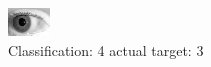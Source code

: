 \begin{figure}[h!]
\begin{center}
\includegraphics[width=0.60\columnwidth]{figures/ID325_class_4_target_3.png}
\end{center}
\caption{ Classification: 4 actual target: 3}
\label{fig:ID325_class_4_target_3}
\end{figure}
